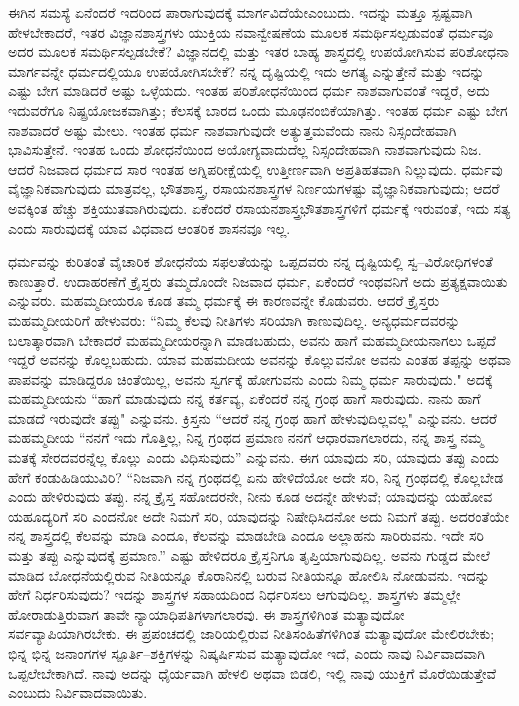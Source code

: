 ಈಗಿನ ಸಮಸ್ಯೆ ಏನೆಂದರೆ ಇದರಿಂದ ಪಾರಾಗುವುದಕ್ಕೆ ಮಾರ್ಗವಿದೆಯೇ\break ಎಂಬುದು. ಇದನ್ನು ಮತ್ತೂ ಸ್ಪಷ್ಟವಾಗಿ ಹೇಳಬೇಕಾದರೆ, ಇತರ ವಿಜ್ಞಾನಶಾಸ್ತ್ರಗಳು ಯುಕ್ತಿಯ ನವಾನ್ವೇಷಣೆಯ ಮೂಲಕ ಸಮರ್ಥಿಸಲ್ಪಡುವಂತೆ ಧರ್ಮವೂ ಅದರ ಮೂಲಕ ಸಮರ್ಥಿಸಲ್ಪಡಬೇಕೆ? ವಿಜ್ಞಾನದಲ್ಲಿ ಮತ್ತು ಇತರ ಬಾಹ್ಯ ಶಾಸ್ತ್ರದಲ್ಲಿ ಉಪಯೋಗಿಸುವ ಪರಿಶೋಧನಾ ಮಾರ್ಗವನ್ನೇ ಧರ್ಮದಲ್ಲಿಯೂ ಉಪಯೋಗಿಸಬೇಕೆ? ನನ್ನ ದೃಷ್ಟಿಯಲ್ಲಿ ಇದು ಅಗತ್ಯ ಎನ್ನುತ್ತೇನೆ ಮತ್ತು ಇದನ್ನು ಎಷ್ಟು ಬೇಗ ಮಾಡಿದರೆ ಅಷ್ಟು ಒಳ್ಳೆಯದು. ಇಂತಹ ಪರಿಶೋಧನೆಯಿಂದ ಧರ್ಮ ನಾಶವಾಗುವಂತೆ ಇದ್ದರೆ, ಅದು ಇದುವರೆಗೂ ನಿಷ್ಪ್ರಯೋಜಕವಾಗಿತ್ತು; ಕೆಲಸಕ್ಕೆ ಬಾರದ ಒಂದು ಮೂಢನಂಬಿಕೆಯಾಗಿತ್ತು. ಇಂತಹ ಧರ್ಮ ಎಷ್ಟು ಬೇಗ ನಾಶವಾದರೆ ಅಷ್ಟು ಮೇಲು. ಇಂತಹ ಧರ್ಮ ನಾಶವಾಗುವುದೇ ಅತ್ಯುತ್ತಮವೆಂದು ನಾನು ನಿಸ್ಸಂದೇಹವಾಗಿ ಭಾವಿಸುತ್ತೇನೆ. ಇಂತಹ ಒಂದು ಶೋಧನೆಯಿಂದ ಅಯೋಗ್ಯವಾದುದೆಲ್ಲ ನಿಸ್ಸಂದೇಹವಾಗಿ ನಾಶವಾಗುವುದು ನಿಜ. ಆದರೆ ನಿಜವಾದ ಧರ್ಮದ ಸಾರ ಇಂತಹ ಅಗ್ನಿಪರೀಕ್ಷೆಯಲ್ಲಿ ಉತ್ತೀರ್ಣವಾಗಿ ಅಪ್ರತಿಹತವಾಗಿ ನಿಲ್ಲುವುದು. ಧರ್ಮವು ವೈಜ್ಞಾನಿಕವಾಗುವುದು ಮಾತ್ರವಲ್ಲ, ಭೌತಶಾಸ್ತ್ರ, ರಸಾಯನಶಾಸ್ತ್ರಗಳ ನಿರ್ಣಯಗಳಷ್ಟು ವೈಜ್ಞಾನಿಕವಾಗುವುದು; ಆದರೆ ಅವಕ್ಕಿಂತ ಹೆಚ್ಚು ಶಕ್ತಿಯುತವಾಗಿರುವುದು. ಏಕೆಂದರೆ ರಸಾಯನಶಾಸ್ತ್ರಭೌತಶಾಸ್ತ್ರಗಳಿಗೆ ಧರ್ಮಕ್ಕೆ ಇರುವಂತೆ, ಇದು ಸತ್ಯ ಎಂದು ಸಾರುವುದಕ್ಕೆ ಯಾವ ವಿಧವಾದ ಆಂತರಿಕ ಶಾಸನವೂ ಇಲ್ಲ.

ಧರ್ಮವನ್ನು ಕುರಿತಂತೆ ವೈಚಾರಿಕ ಶೋಧನೆಯ ಸಫಲತೆಯನ್ನು ಒಪ್ಪದವರು ನನ್ನ ದೃಷ್ಟಿಯಲ್ಲಿ ಸ್ವ–ವಿರೋಧಿಗಳಂತೆ ಕಾಣುತ್ತಾರೆ. ಉದಾಹರಣೆಗೆ ಕ್ರೈಸ್ತರು ತಮ್ಮದೊಂದೇ ನಿಜವಾದ ಧರ್ಮ, ಏಕೆಂದರೆ ಇಂಥವನಿಗೆ ಅದು ಪ್ರತ್ಯಕ್ಷವಾಯಿತು ಎನ್ನುವರು. ಮಹಮ್ಮದೀಯರೂ ಕೂಡ ತಮ್ಮ ಧರ್ಮಕ್ಕೆ ಈ ಕಾರಣವನ್ನೇ ಕೊಡುವರು. ಆದರೆ ಕ್ರೈಸ್ತರು ಮಹಮ್ಮದೀಯರಿಗೆ ಹೇಳುವರು: “ನಿಮ್ಮ ಕೆಲವು ನೀತಿಗಳು ಸರಿಯಾಗಿ ಕಾಣುವುದಿಲ್ಲ. ಅನ್ಯಧರ್ಮದವರನ್ನು ಬಲಾತ್ಕಾರವಾಗಿ ಬೇಕಾದರೆ ಮಹಮ್ಮದೀಯರನ್ನಾಗಿ ಮಾಡಬಹುದು, ಅವನು ಹಾಗೆ ಮಹಮ್ಮದೀಯನಾಗಲು ಒಪ್ಪದೆ ಇದ್ದರೆ ಅವನನ್ನು ಕೊಲ್ಲಬಹುದು. ಯಾವ ಮಹಮದೀಯ ಅವನನ್ನು ಕೊಲ್ಲುವನೋ ಅವನು ಎಂತಹ ತಪ್ಪನ್ನು ಅಥವಾ ಪಾಪವನ್ನು ಮಾಡಿದ್ದರೂ ಚಿಂತೆಯಿಲ್ಲ, ಅವನು ಸ್ವರ್ಗಕ್ಕೆ ಹೋಗುವನು ಎಂದು ನಿಮ್ಮ ಧರ್ಮ ಸಾರುವುದು." ಅದಕ್ಕೆ ಮಹಮ್ಮದೀಯನು “ಹಾಗೆ ಮಾಡುವುದು ನನ್ನ ಕರ್ತವ್ಯ, ಏಕೆಂದರೆ ನನ್ನ ಗ್ರಂಥ ಹಾಗೆ ಸಾರುವುದು. ನಾನು ಹಾಗೆ ಮಾಡದೆ ಇರುವುದೇ ತಪ್ಪು" ಎನ್ನುವನು. ಕ್ರಿಸ್ತನು “ಆದರೆ ನನ್ನ ಗ್ರಂಥ ಹಾಗೆ ಹೇಳುವುದಿಲ್ಲವಲ್ಲ" ಎನ್ನುವನು. ಆದರೆ ಮಹಮ್ಮದೀಯ “ನನಗೆ ಇದು ಗೊತ್ತಿಲ್ಲ, ನಿನ್ನ ಗ್ರಂಥದ ಪ್ರಮಾಣ ನನಗೆ ಆಧಾರವಾಗಲಾರದು, ನನ್ನ ಶಾಸ್ತ್ರ ನಮ್ಮ ಮತಕ್ಕೆ ಸೇರದವರನ್ನೆಲ್ಲ ಕೊಲ್ಲು ಎಂದು ವಿಧಿಸುವುದು'' ಎನ್ನುವನು. ಈಗ ಯಾವುದು ಸರಿ, ಯಾವುದು ತಪ್ಪು ಎಂದು ಹೇಗೆ ಕಂಡುಹಿಡಿಯುವಿರಿ? “ನಿಜವಾಗಿ ನನ್ನ ಗ್ರಂಥದಲ್ಲಿ ಏನು ಹೇಳಿದೆಯೋ ಅದೇ ಸರಿ, ನಿನ್ನ ಗ್ರಂಥದಲ್ಲಿ ಕೊಲ್ಲಬೇಡ ಎಂದು ಹೇಳಿರುವುದು ತಪ್ಪು. ನನ್ನ ಕ್ರೈಸ್ತ ಸಹೋದರನೇ, ನೀನು ಕೂಡ ಅದನ್ನೇ ಹೇಳುವೆ; ಯಾವುದನ್ನು ಯಹೋವ ಯಹೂದ್ಯರಿಗೆ ಸರಿ ಎಂದನೋ ಅದೇ ನಿಮಗೆ ಸರಿ, ಯಾವುದನ್ನು ನಿಷೇಧಿಸಿದನೋ ಅದು ನಿಮಗೆ ತಪ್ಪು. ಅದರಂತೆಯೇ ನನ್ನ ಶಾಸ್ತ್ರದಲ್ಲಿ ಕೆಲವನ್ನು ಮಾಡಿ ಎಂದೂ, ಕೆಲವನ್ನು ಮಾಡಬೇಡಿ ಎಂದೂ ಅಲ್ಲಾಹನು ಸಾರಿರುವನು. ಇದೇ ಸರಿ ಮತ್ತು ತಪ್ಪು ಎನ್ನುವುದಕ್ಕೆ ಪ್ರಮಾಣ.” ಎಷ್ಟು ಹೇಳಿದರೂ ಕ್ರೈಸ್ತನಿಗೂ ತೃಪ್ತಿಯಾಗುವುದಿಲ್ಲ. ಅವನು ಗುಡ್ಡದ ಮೇಲೆ ಮಾಡಿದ ಬೋಧನೆಯಲ್ಲಿರುವ ನೀತಿಯನ್ನೂ ಕೊರಾನಿನಲ್ಲಿ ಬರುವ ನೀತಿಯನ್ನೂ ಹೋಲಿಸಿ ನೋಡುವನು. ಇದನ್ನು ಹೇಗೆ ನಿರ್ಧರಿಸುವುದು? ಇದನ್ನು ಶಾಸ್ತ್ರಗಳ ಸಹಾಯದಿಂದ ನಿರ್ಧರಿಸಲು ಆಗುವುದಿಲ್ಲ. ಶಾಸ್ತ್ರಗಳು ತಮ್ಮಲ್ಲೇ ಹೋರಾಡುತ್ತಿರುವಾಗ ತಾವೇ ನ್ಯಾಯಾಧಿಪತಿಗಳಾಗಲಾರವು. ಈ ಶಾಸ್ತ್ರಗಳಿಗಿಂತ ಮತ್ಯಾವುದೋ ಸರ್ವವ್ಯಾಪಿಯಾಗಿರಬೇಕು. ಈ ಪ್ರಪಂಚದಲ್ಲಿ ಜಾರಿಯಲ್ಲಿರುವ ನೀತಿಸಂಹಿತೆಗಳಿಗಿಂತ ಮತ್ಯಾವುದೋ ಮೇಲಿರಬೇಕು; ಭಿನ್ನ ಭಿನ್ನ ಜನಾಂಗಗಳ ಸ್ಪೂರ್ತಿ–ಶಕ್ತಿಗಳನ್ನು ನಿಷ್ಕರ್ಷಿಸುವ ಮತ್ಯಾವುದೋ ಇದೆ, ಎಂದು ನಾವು ನಿರ್ವಿವಾದವಾಗಿ ಒಪ್ಪಲೇಬೇಕಾಗಿದೆ. ನಾವು ಅದನ್ನು ಧೈರ್ಯವಾಗಿ ಹೇಳಲಿ ಅಥವಾ ಬಿಡಲಿ, ಇಲ್ಲಿ ನಾವು ಯುಕ್ತಿಗೆ ಮೊರೆಯಿಡುತ್ತೇವೆ ಎಂಬುದು ನಿರ್ವಿವಾದವಾಯಿತು.

